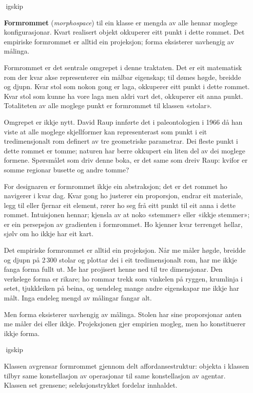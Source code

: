 igskip

\textbf{Formrommet} (\textit{morphospace}) til ein klasse er mengda av alle hennar moglege konfigurasjonar. Kvart realisert objekt okkuperer eitt punkt i dette rommet. Det empiriske formrommet er alltid ein projeksjon; forma eksisterer uavhengig av målinga.

Formrommet er det sentrale omgrepet i denne traktaten. Det er eit matematisk rom der kvar akse representerer ein målbar eigenskap; til dømes høgde, breidde og djupn. Kvar stol som nokon gong er laga, okkuperer eitt punkt i dette rommet. Kvar stol som kunne ha vore laga men aldri vart det, okkuperer eit anna punkt. Totaliteten av alle moglege punkt er formrommet til klassen «stolar».

Omgrepet er ikkje nytt. David Raup innførte det i paleontologien i 1966 då han viste at alle moglege skjellformer kan representerast som punkt i eit tredimensjonalt rom definert av tre geometriske parametrar. Dei fleste punkt i dette rommet er tomme; naturen har berre okkupert ein liten del av dei moglege formene. Spørsmålet som driv denne boka, er det same som dreiv Raup: kvifor er somme regionar busette og andre tomme?

For designaren er formrommet ikkje ein abstraksjon; det er det rommet ho navigerer i kvar dag. Kvar gong ho justerer ein proporsjon, endrar eit materiale, legg til eller fjernar eit element, rører ho seg frå eitt punkt til eit anna i dette rommet. Intuisjonen hennar; kjensla av at noko «stemmer» eller «ikkje stemmer»; er ein persepsjon av gradienten i formrommet. Ho kjenner kvar terrenget hellar, sjølv om ho ikkje har eit kart.

Det empiriske formrommet er alltid ein projeksjon. Når me måler høgde, breidde og djupn på 2\,300 stolar og plottar dei i eit tredimensjonalt rom, har me ikkje fanga forma fullt ut. Me har projisert henne ned til tre dimensjonar. Den verkelege forma er rikare; ho rommar trekk som vinkelen på ryggen, krumlinja i setet, tjukkleiken på beina, og uendeleg mange andre eigenskapar me ikkje har målt. Inga endeleg mengd av målingar fangar alt.

Men forma eksisterer uavhengig av målinga. Stolen har sine proporsjonar anten me måler dei eller ikkje. Projeksjonen gjer empirien mogleg, men ho konstituerer ikkje forma.

igskip

Klassen avgrensar formrommet gjennom delt affordansestruktur: objekta i klassen tilbyr same konstellasjon av operasjonar til same konstellasjon av agentar. Klassen set grensene; seleksjonstrykket fordelar innhaldet.

